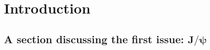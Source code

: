

\chapter{Introduction}


\section[A section discussing the first issue: \(J/\psi\)]{A section discussing the first issue: \ifpdftex\(\bm{J}/\bm{\psi}\)\fi}
